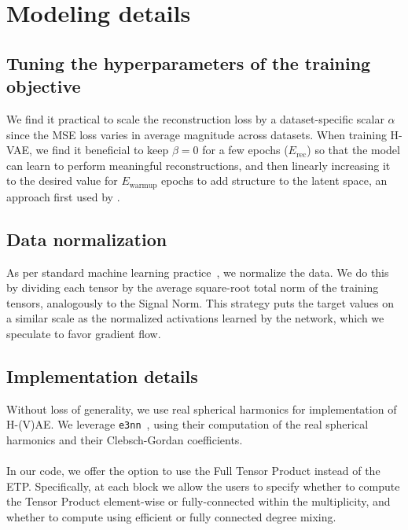 
\section{Modeling details}

\subsection{Tuning the hyperparameters of the training objective}
\label{sec:training_objective_hyperparams}
We find it practical to scale the reconstruction loss by a dataset-specific scalar $\alpha$ since
the MSE loss varies in average magnitude across datasets. When training H-VAE, we find it
beneficial to keep $\beta = 0$ for a few epochs ($E_\text{rec}$) so that the model can learn to
perform meaningful reconstructions, and then linearly increasing it to the desired value for
$E_\text{warmup}$ epochs to add structure to the latent space, an approach first used by
\citet{bowman_generating_2016}.

\subsection{Data normalization}
\label{sec:data_normalization}
As per standard machine learning practice~\cite{shanker_effect_1996}, we normalize the data. We do
this by dividing each tensor by the average square-root total norm of the training tensors,
analogously to the Signal Norm. This strategy puts the target values on a similar scale as the
normalized activations learned by the network, which we speculate to favor gradient flow.

\subsection{Implementation details}
Without loss of generality, we use real spherical harmonics for implementation of H-(V)AE. 
We leverage \verb|e3nn|~\cite{geiger_e3nn_2022}, using their computation of the real spherical
harmonics and their Clebsch-Gordan coefficients.\\
\\
In our code, we offer the option to use the Full Tensor Product instead of the ETP. Specifically,
at each block we allow the users to specify whether to compute the Tensor Product element-wise or
fully-connected within the multiplicity, and whether to compute using efficient or fully connected
degree mixing.


